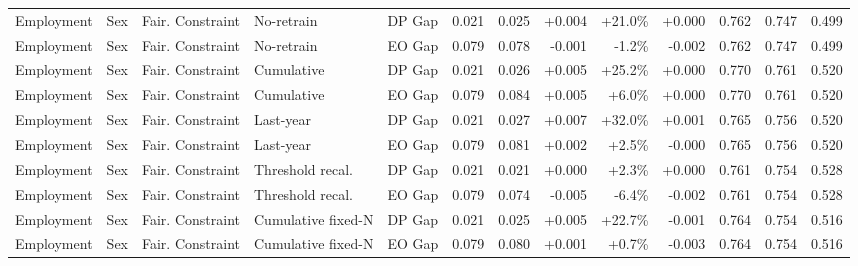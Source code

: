 \begin{longtable}{llcllrrrrrrrr}
Employment & Sex & Fair. Constraint & No-retrain & DP Gap & 0.021 & 0.025 & +0.004 & +21.0\% & +0.000 & 0.762 & 0.747 & 0.499 \\
Employment & Sex & Fair. Constraint & No-retrain & EO Gap & 0.079 & 0.078 & -0.001 & -1.2\% & -0.002 & 0.762 & 0.747 & 0.499 \\
Employment & Sex & Fair. Constraint & Cumulative & DP Gap & 0.021 & 0.026 & +0.005 & +25.2\% & +0.000 & 0.770 & 0.761 & 0.520 \\
Employment & Sex & Fair. Constraint & Cumulative & EO Gap & 0.079 & 0.084 & +0.005 & +6.0\% & +0.000 & 0.770 & 0.761 & 0.520 \\
Employment & Sex & Fair. Constraint & Last-year & DP Gap & 0.021 & 0.027 & +0.007 & +32.0\% & +0.001 & 0.765 & 0.756 & 0.520 \\
Employment & Sex & Fair. Constraint & Last-year & EO Gap & 0.079 & 0.081 & +0.002 & +2.5\% & -0.000 & 0.765 & 0.756 & 0.520 \\
Employment & Sex & Fair. Constraint & Threshold recal. & DP Gap & 0.021 & 0.021 & +0.000 & +2.3\% & +0.000 & 0.761 & 0.754 & 0.528 \\
Employment & Sex & Fair. Constraint & Threshold recal. & EO Gap & 0.079 & 0.074 & -0.005 & -6.4\% & -0.002 & 0.761 & 0.754 & 0.528 \\
Employment & Sex & Fair. Constraint & Cumulative fixed-N & DP Gap & 0.021 & 0.025 & +0.005 & +22.7\% & -0.001 & 0.764 & 0.754 & 0.516 \\
Employment & Sex & Fair. Constraint & Cumulative fixed-N & EO Gap & 0.079 & 0.080 & +0.001 & +0.7\% & -0.003 & 0.764 & 0.754 & 0.516 \\
\bottomrule
\end{longtable}
\endgroup
